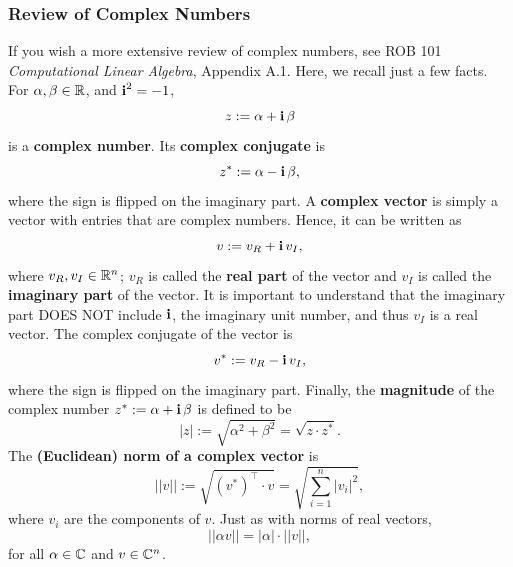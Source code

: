 \begin{center}
\setlength{\fboxrule}{2pt}  %
\end{center}

\subsubsection{Review of Complex Numbers}

If you wish a more extensive review of complex numbers, see ROB 101 \textit{Computational Linear Algebra}, Appendix A.1. Here, we recall just a few facts. For $\alpha, \beta \in \mathbb R$, and $\mathop{\bm{\mathrm i}}^2 = -1$,
$$z := \alpha + \mathop{\bm{\mathrm i}} \beta$$
is a \textbf{complex number}. Its \textbf{complex conjugate} is 
$$z^\ast:= \alpha - \mathop{\bm{\mathrm i}} \beta,$$
where the sign is flipped on the imaginary part.
A \textbf{complex vector} is simply a vector with entries that are complex numbers. Hence, it can be written as
$$v:= v_R + \mathop{\bm{\mathrm i}} v_I,$$
where $v_R, v_I \in \mathbb R^n$; $v_R$ is called the \textbf{real part} of the vector and $v_I$ is called the \textbf{imaginary part} of the vector. It is important to understand that the imaginary part DOES NOT include $\mathop{\bm{\mathrm i}}$, the imaginary unit number, and thus $v_I$ is a real vector. The complex conjugate of the vector is 
$$v^\ast:= v_R - \mathop{\bm{\mathrm i}} v_I,$$
where the sign is flipped on the imaginary part. Finally, the \textbf{magnitude} of the complex number $z^\ast:= \alpha + \mathop{\bm{\mathrm i}} \beta$ is defined to be
$$|z|:=\sqrt{\alpha^2 + \beta^2} = \sqrt{z \cdot z^\ast}.$$
The \textbf{(Euclidean) norm of a complex vector} is
$$||v||:= \sqrt{\left(v^\ast\right)^\top \cdot v} = \sqrt{\sum_{i=1}^n |v_i|^2},$$
where $v_i$ are the components of $v$. Just as with norms of real vectors, $$||\alpha v|| = |\alpha| \cdot ||v||,$$
for all $\alpha \in \mathbb C$ and $v \in \mathbb C^n$.
\\

